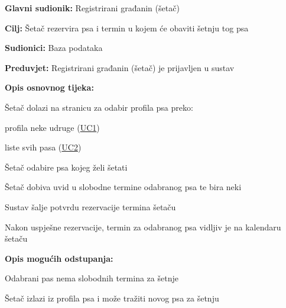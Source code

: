 		\noindent {}
	\begin{packed_item}
		
		\item \textbf{Glavni sudionik:} Registrirani građanin (šetač)
		\item  \textbf{Cilj:} Šetač rezervira psa i termin u kojem će obaviti šetnju tog psa
		\item  \textbf{Sudionici:} Baza podataka
		\item  \textbf{Preduvjet:} Registrirani građanin (šetač) je prijavljen u sustav
		\item  \textbf{Opis osnovnog tijeka:}
		
		\item[] \begin{packed_enum}
			\item Šetač dolazi na stranicu za odabir profila psa preko:
				\item[] \begin{packed_enum}
					\item profila neke udruge (\hyperlink{UC1}{UC1})
					\item liste svih pasa (\hyperlink{UC2}{UC2})
				\end{packed_enum}
			\item Šetač odabire psa kojeg želi šetati
			\item Šetač dobiva uvid u slobodne termine odabranog psa te bira neki
			\item Sustav šalje potvrdu rezervacije termina šetaču
			\item Nakon uspješne rezervacije, termin za odabranog psa vidljiv je na kalendaru šetaču
		\end{packed_enum}
		\item  \textbf{Opis mogućih odstupanja:}
		
		\item[] \begin{packed_item}
			
			\item [4.a]  Odabrani pas nema slobodnih termina za šetnje
			\item[] \begin{packed_enum}
				\item Šetač izlazi iz profila psa i može tražiti novog psa za šetnju
			\end{packed_enum}
		\end{packed_item}
	\end{packed_item}



